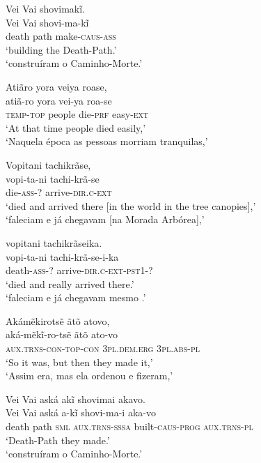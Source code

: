\documentclass[output=paper,
modfonts,nonflat
]{langsci/langscibook}
\begin{document}
\ea Vei Vai shovimakĩ. \\[.3em]
\gll Vei   Vai  shovi-ma-kĩ            \\
     death path make-\textsc{caus-ass} \\
\glt `building the Death-Path.' \\
`construíram o Caminho-Morte.'\\
\z

\ea Atiãro yora veiya roase, \\[.3em]
\gll atiã-ro          yora   vei-ya           roa-se            \\
     \textsc{temp-top} people die-\textsc{prf} easy-\textsc{ext} \\
\glt `At that time people died easily,' \\
`Naquela época as pessoas morriam tranquilas,' \\
\z

\ea Vopitani tachikrãse, \\[.3em]
\gll vopi-ta-ni        tachi-krã-se              \\
     die-\textsc{ass-?} arrive-\textsc{dir.c-ext} \\
\glt `died and arrived there {[}in the world in the tree canopies{]},' \\
`faleciam e já chegavam [na Morada Arbórea],' \\
\z

\newpage 
\ea vopitani tachikrãseika. \\[.3em]
\gll vopi-ta-ni           tachi-krã-se-i-ka                \\
     death-\textsc{ass-?} arrive-\textsc{dir.c-ext-pst1-?} \\
\glt `died and really arrived there.'\footnotemark \\
`faleciam e já chegavam mesmo .' \\
\z


\ea Akámẽkirotsẽ ãtõ atovo, \\[.3em]
\gll aká-mẽkĩ-ro-tsẽ               ãtõ                  ato-vo              \\
     \textsc{aux.trns-con-top-con} 3\textsc{pl.dem.erg} 3\textsc{pl.abs-pl} \\
\glt `So it was, but then they made it,' \\
`Assim era, mas ela ordenou e fizeram,'\\
\z

\ea Vei Vai aská akĩ shovimai akavo. \\[.3em]
\gll Vei   Vai  aská         a-kĩ                   shovi-ma-i               aka-vo               \\
     death path \textsc{sml} \textsc{aux.trns-sssa} built-\textsc{caus-prog} \textsc{aux.trns-pl} \\
\glt `Death-Path they made.' \\
`construíram o Caminho-Morte.'\\
\z
\end{document}
